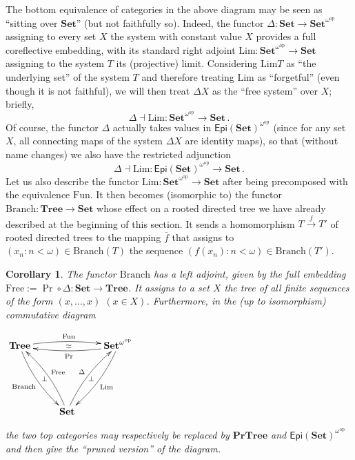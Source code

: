 \documentclass[12pt]{amsart}
\newtheorem{cor}[thm]{Corollary}
\theoremstyle{definition}
\newcommand{\seq}[1]{{\left( {#1} \right)}}
\newcommand{\Sets}{\mathbf{Set}}
\newcommand{\Tree}{\mathbf{Tree}}
\newcommand{\PrTree}{\mathbf{PrTree}}
\newcommand{\SetNop}{\Sets^{\omega^{\op}}}
\newcommand{\op}{\mathrm{op}}
\newcommand{\Br}{\mathrm{Branch}}
\begin{document}
The bottom equivalence of categories in the above diagram may be seen as ``sitting over $\Sets$'' (but not faithfully so). Indeed, the functor $\Delta: \Sets \to \SetNop$ assigning to every set $X$ the system with constant value $X$ provides a full coreflective embedding, with its standard right adjoint $\mathrm{Lim}\colon\SetNop\to\Sets$ assigning to the system $T$ its (projective) limit. 
Considering $\mathrm{Lim}T$ as ``the underlying set'' of the system $T$ and therefore treating $\mathrm{Lim}$ as ``forgetful'' (even though it is not faithful), we will then treat $\Delta X$ as the ``free system'' over $X$; briefly,
\[
\Delta\dashv\mathrm{Lim}\colon\SetNop\to\Sets\,.
\]		
Of course, the functor $\Delta$ actually takes values in $\mathsf{Epi}(\Sets)^{\omega^\op}$ (since for any set $X$, all connecting maps of the system $\Delta X$ are identity maps), so that (without name changes) we also have the restricted adjunction
\[
\Delta\dashv\mathrm{Lim}\colon\mathsf{Epi}(\Sets)^{\omega^\op}\to\Sets\,.
\]
Let us also describe the functor $\mathrm{Lim}\colon\SetNop\to\Sets$ after being precomposed with the equivalence $\mathrm{Fun}$. It then becomes (isomorphic to) the functor
$\mathrm{Branch}\colon \Tree\to \Sets$
whose effect on a rooted directed tree we have already described at the beginning of this section. It sends a homomorphism $T\stackrel{f}{\to}T'$ of rooted directed trees to the mapping $\overline{f}$ that assigns to $\seq{x_n:n<\omega}\in \Br(T)$ the sequence $\seq{f(x_n):n<\omega}\in \Br(T')$.

\begin{cor}\label{COR_Branch}
	The functor $\Br$ has a left adjoint, given by the full embedding $\mathrm{Free}:=\Pr\circ\Delta\colon\Sets\to\Tree$. It assigns to a set $X$ the tree of all finite sequences of the form $(x,\dots, x)$ $(x\in X)$. Furthermore, in the (up to isomorphism) commutative diagram
	\begin{center}
		$\xymatrix{\Tree\ar@/^0.4pc/[rr]^{\mathrm{Fun}}_{\simeq}\ar@/_0.5pc/[ddr]_{\mathrm{Branch}}^{\bot} && \SetNop\ar@/^0.4pc/[ll]^{\mathrm{Pr}}\ar@/^0.5pc/[ldd]^{\mathrm{Lim}}_{\bot}\\
			&&\\
			&\Sets\ar@/_0.5pc/[luu]_{\mathrm{Free}}\ar@/^0.5pc/[uur]^{\Delta}&\\
		}$
	\end{center}
	the two top categories may respectively be replaced by $\PrTree$ and $\mathsf{Epi}(\Sets)^{\omega^\op}$ and then give  the ``pruned version'' of the diagram.	
\end{cor}
\end{document}

